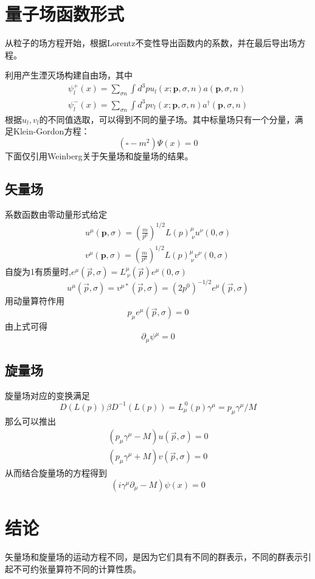 \documentclass[10pt]{ctexart}
\begin{document}
\section{量子场函数形式}
从粒子的场方程开始，根据Lorentz不变性导出函数内的系数，并在最后导出场方程。

利用产生湮灭场构建自由场，其中
\begin{align}
    \psi^+_l(x)=\sum_{\sigma n}{\int{d^3pu_l(x;\mathbf{p},\sigma,n)a(\mathbf{p},\sigma,n)}}\\
    \psi^-_l(x)=\sum_{\sigma n}{\int{d^3pv_l(x;\mathbf{p},\sigma,n)a^\dagger(\mathbf{p},\sigma,n)}}
\end{align}
根据$u_l,v_l$的不同值选取，可以得到不同的量子场\cite{weinberg}。其中标量场只有一个分量，满足Klein-Gordon方程\cite{weinberg}：
\begin{equation}
    (\square-m^2)\Psi(x)=0
\end{equation}
下面仅引用Weinberg关于矢量场和旋量场的结果。

\subsection{矢量场}
系数函数由零动量形式给定\cite{weinberg}
\begin{align}
    u^\mu(\mathbf{p},\sigma)=(\frac{m}{p^0})^{1/2}L(p)^\mu_{\ \nu}u^\nu(0,\sigma)\\
    v^\mu(\mathbf{p},\sigma)=(\frac{m}{p^0})^{1/2}L(p)^\mu_{\ \nu}v^\nu(0,\sigma)
\end{align}
自旋为1有质量时,$e^\mu(\vec{p},\sigma)=L^\mu_{\ \nu}(\vec{p})e^\mu(0,\sigma)$
\begin{equation}
    u^\mu(\vec{p},\sigma)=v^{\mu*}(\vec{p},\sigma)=(2p^0)^{-1/2}e^\mu(\vec{p},\sigma)
\end{equation}
用动量算符作用
\begin{equation}
    p_\mu e^\mu(\vec{p},\sigma)=0
\end{equation}
由上式可得
\begin{equation}
    \partial_\mu\psi^\mu=0
\end{equation}
\subsection{旋量场}
旋量场对应的变换满足
\begin{equation}
    D(L(p))\beta D^{-1}(L(p))=L^{\ 0}_\mu(p)\gamma^\mu=p_\mu\gamma^\mu/M
\end{equation}
那么可以推出
\begin{align}
    (p_\mu\gamma^\mu-M)u(\vec{p},\sigma)=0\\
    (p_\mu\gamma^\mu+M)v(\vec{p},\sigma)=0
\end{align}
从而结合旋量场的方程得到
\begin{equation}
    (i\gamma^\mu\partial_\mu-M)\psi(x)=0
\end{equation}
\section{结论}
矢量场和旋量场的运动方程不同，是因为它们具有不同的群表示，不同的群表示引起不可约张量算符不同的计算性质。

\end{document}
